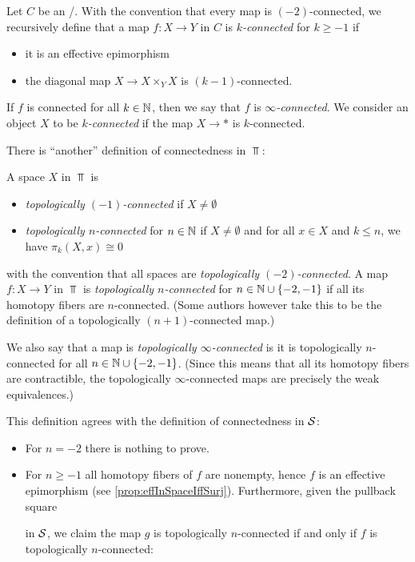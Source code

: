 \begin{definition}\label{def:connected}
    Let $C$ be an \inftytop/.
    With the convention that every map is $(-2)$-connected, we recursively define that a map $f\colon X\to Y$ in $C$ is \emph{$k$-connected} for $k\geq -1$ if
    \begin{itemize}
        \item it is an effective epimorphism
        \item the diagonal map $X\to X\times_YX$ is $(k-1)$-connected.
    \end{itemize} 
    If $f$ is connected for all $k\in\mathbb{N}$, then we say that $f$ is \emph{$\infty$-connected}.
    We consider an object $X$ to be \emph{$k$-connected} if the map $X\to *$ is $k$-connected.
\end{definition}
\begin{remark}
    There is ``another'' definition of connectedness in $\Top$:

    A space $X$ in $\Top$ is 
    \begin{itemize}
        \item \emph{topologically $(-1)$-connected} if $X\neq\emptyset$
        \item \emph{topologically $n$-connected} for $n\in\mathbb{N}$ if $X\neq\emptyset$ and for all $x\in X$ and $k\leq n$, we have $\pi_k(X,x)\cong 0$
    \end{itemize}
    with the convention that all spaces are \emph{topologically $(-2)$-connected}.
    A map $f\colon X\to Y$ in $\Top$ is \emph{topologically $n$-connected} for $n\in\mathbb{N}\cup\left\lbrace-2,-1\right\rbrace$ if all its homotopy fibers are $n$-connected. 
    (Some authors however take this to be the definition of a topologically $(n+1)$-connected map.)
    
    We also say that a map is \emph{topologically $\infty$-connected} is it is topologically $n$-connected for all $n\in\mathbb{N}\cup\left\lbrace-2,-1\right\rbrace$.
    (Since this means that all its homotopy fibers are contractible, the topologically $\infty$-connected maps are precisely the weak equivalences.)

    This definition agrees with the definition of connectedness in $\mathcal{S}$:
    \begin{itemize}
        \item For $n=-2$ there is nothing to prove.
        \item For $n\geq -1$ all homotopy fibers of $f$ are nonempty, hence $f$ is an effective epimorphism (see \cref{prop:effInSpaceIffSurj}).
            Furthermore, given the pullback square
            \begin{center}
            \end{center}
            in $\mathcal{S}$, we claim the map $g$ is topologically $n$-connected if and only if $f$ is topologically $n$-connected:
            

\end{itemize}
\end{remark}
